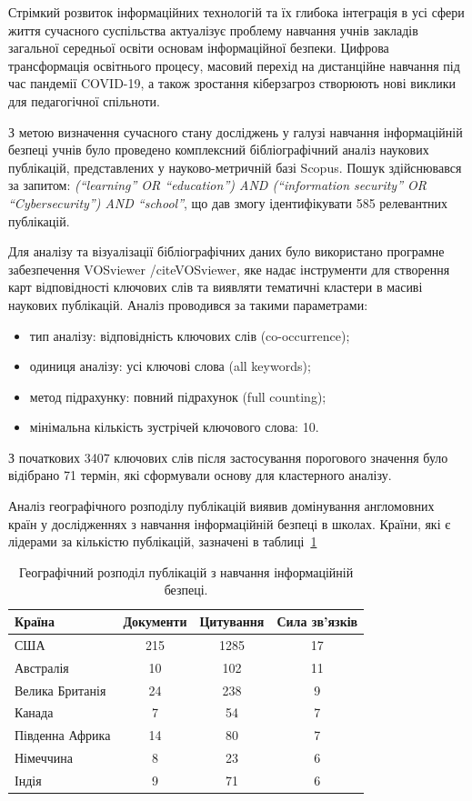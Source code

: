 


Стрімкий розвиток інформаційних технологій та їх глибока інтеграція в усі сфери життя сучасного суспільства актуалізує проблему навчання учнів закладів загальної середньої освіти основам інформаційної безпеки. Цифрова трансформація освітнього процесу, масовий перехід на дистанційне навчання під час пандемії COVID-19, а також зростання кіберзагроз створюють нові виклики для педагогічної спільноти.

З метою визначення сучасного стану досліджень у галузі навчання інформаційній безпеці учнів було проведено комплексний бібліографічний аналіз наукових публікацій, представлених у науково-метричній базі Scopus. Пошук здійснювався за запитом: \textit{(``learning'' OR ``education'') AND (``information security'' OR ``Cybersecurity'') AND ``school''}, що дав змогу ідентифікувати 585 релевантних публікацій.

Для аналізу та візуалізації бібліографічних даних було використано програмне забезпечення VOSviewer /cite{VOSviewer}, яке надає інструменти для створення карт відповідності ключових слів та виявляти тематичні кластери в масиві наукових публікацій. Аналіз проводився за такими параметрами:
\begin{itemize}
    \item тип аналізу: відповідність ключових слів (co-occurrence);
    \item одиниця аналізу: усі ключові слова (all keywords);
    \item метод підрахунку: повний підрахунок (full counting);
    \item мінімальна кількість зустрічей ключового слова: 10.
\end{itemize}

З початкових 3407 ключових слів після застосування порогового значення було відібрано 71 термін, які сформували основу для кластерного аналізу.


Аналіз географічного розподілу публікацій виявив домінування англомовних країн у дослідженнях з навчання інформаційній безпеці в школах. Країни, які є лідерами за кількістю публікацій, зазначені в таблиці~\ref{leaders}

\begin{table}[h] 
\centering
\caption{Географічний розподіл публікацій з навчання інформаційній безпеці.}
\label{leaders}
\begin{tabular}{|l|c|c|c|}
\hline
\textbf{Країна} & \textbf{Документи} & \textbf{Цитування} & \textbf{Сила зв'язків} \\
\hline
США & 215 & 1285 & 17 \\
Австралія & 10 & 102 & 11 \\
Велика Британія & 24 & 238 & 9 \\
Канада & 7 & 54 & 7 \\
Південна Африка & 14 & 80 & 7 \\
Німеччина & 8 & 23 & 6 \\
Індія & 9 & 71 & 6 \\
\hline
\end{tabular}
\end{table}


